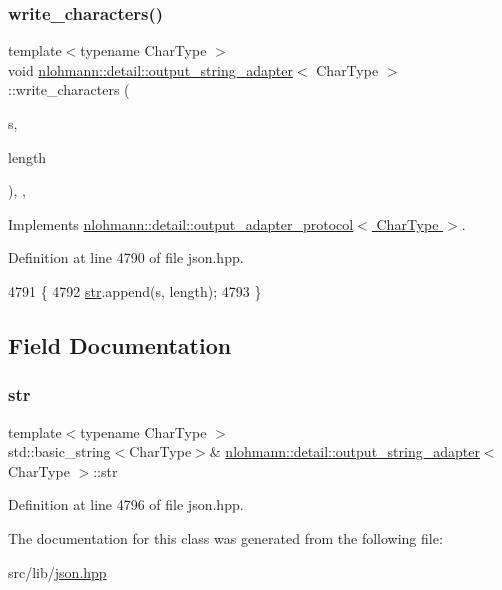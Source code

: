 \subsubsection{\texorpdfstring{write\+\_\+characters()}{write\_characters()}}
{\footnotesize\ttfamily template$<$typename Char\+Type $>$ \\
void \hyperlink{classnlohmann_1_1detail_1_1output__string__adapter}{nlohmann\+::detail\+::output\+\_\+string\+\_\+adapter}$<$ Char\+Type $>$\+::write\+\_\+characters (\begin{DoxyParamCaption}\item[{const Char\+Type $\ast$}]{s,  }\item[{std\+::size\+\_\+t}]{length }\end{DoxyParamCaption})\hspace{0.3cm}{\ttfamily [inline]}, {\ttfamily [override]}, {\ttfamily [virtual]}}



Implements \hyperlink{structnlohmann_1_1detail_1_1output__adapter__protocol_a2f410a164e0eda17cf6561114b0eee4a}{nlohmann\+::detail\+::output\+\_\+adapter\+\_\+protocol$<$ Char\+Type $>$}.



Definition at line 4790 of file json.\+hpp.


\begin{DoxyCode}
4791     \{
4792         \hyperlink{classnlohmann_1_1detail_1_1output__string__adapter_afdf2c531466e6111b13d7a913bcf2507}{str}.append(s, length);
4793     \}
\end{DoxyCode}


\subsection{Field Documentation}
\mbox{\label{classnlohmann_1_1detail_1_1output__string__adapter_afdf2c531466e6111b13d7a913bcf2507}} 
\subsubsection{\texorpdfstring{str}{str}}
{\footnotesize\ttfamily template$<$typename Char\+Type $>$ \\
std\+::basic\+\_\+string$<$Char\+Type$>$\& \hyperlink{classnlohmann_1_1detail_1_1output__string__adapter}{nlohmann\+::detail\+::output\+\_\+string\+\_\+adapter}$<$ Char\+Type $>$\+::str\hspace{0.3cm}{\ttfamily [private]}}



Definition at line 4796 of file json.\+hpp.



The documentation for this class was generated from the following file\+:\begin{DoxyCompactItemize}
\item 
src/lib/\hyperlink{json_8hpp}{json.\+hpp}\end{DoxyCompactItemize}
